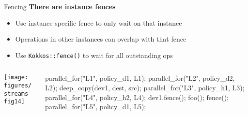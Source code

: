 
\begin{frame}[fragile]{Fencing}
	\textbf{There are instance fences}
  \begin{itemize}
    \item{Use instance specific fence to only wait on that instance}
    \item{Operations in other instances can overlap with that fence}
    \item{Use \texttt{Kokkos::fence()} to wait for all outstanding ops}
  \end{itemize}

  \begin{columns}[]
    \begin{column}{.67\textwidth}

       \texttt{[image: figures/streams-fig14]} 
 
    \end{column}

    \begin{column}{.33\textwidth}
	    \begin{code}[linebackgroundcolor={},keywords={L1,L2,policy_device}]
parallel_for("L1", 
  policy_d1, L1);
parallel_for("L2", 
  policy_d2, L2);
deep_copy(dev1,
  dest, src);
parallel_for("L3", 
  policy_h1, L3);
parallel_for("L4", 
  policy_h2, L4);
dev1.fence();
foo();
fence();
parallel_for("L5", 
  policy_d1, L5);
      \end{code}
    \end{column}
  \end{columns}
\end{frame}



